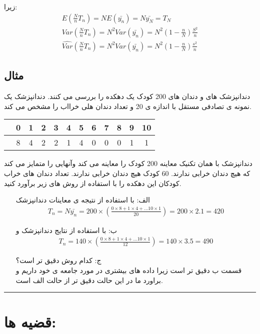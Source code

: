 زیرا:
\begin{gather*}
	E(\frac{N}{n}T_n)=NE(\bar{y_n})=N\bar{y_N}=T_N \\
	Var(\frac{N}{n}T_n)=N^2Var(\bar{y_n})=N^2(1-\frac{n}{N})\frac{S^2}{n} \\
	\hat{Var}(\frac{N}{n}T_n)=N^2Var(\bar{y_n})=N^2(1-\frac{n}{N})\frac{s^2}{n}
\end{gather*}
\subsection*{مثال}
دندانپزشک های 
و 
دندان های 200 کودک یک دهکده را بررسی می کنند.
دندانپزشک 
یک نمونه ی تصادفی مستقل با اندازه ی 20 و تعداد دندان هلی خرااب را مشخص می کند.
\vspace{1cm}
\begin{LTR}
	\begin{tabular}{|c|c|c|c|c|c|c|c|c|c|c|c|}
		\hline
		\rl{تعداد دندان های خراب} 
		& 0 & 1 & 2 & 3 & 4 & 5 & 6 & 7 & 8 & 9 & 10 \\
		\hline
		\rl{تعداد بچه ها}
		&
		8 & 4 & 2 & 2 & 1 & 4 & 0 & 0 & 0 & 1 & 1 \\
		\hline
	\end{tabular}
\end{LTR}
\vspace{1cm}
دندانپزشک 
با همان تکنیک معاینه 200 کودک را معاینه می کند وآنهایی را متمایز می کند که هیچ دندان خرابی ندارند.
60 کودک هیچ دندان خرابی ندارند.
تعداد دندان های خراب کودکان این دهکده را با استفاده از روش های زیر برآورد کنید.
\begin{itemize}
	\item[الف:] با استفاده از نتیجه ی معاینات دندانپزشک 
	\begin{gather*}
		T_n=N\bar{y_n}=200\times (\frac{0\times 8 + 1\times 4 + \dots 10\times 1}{20})
		=200\times 2.1=420
	\end{gather*}
	\item[ب:] با استفاده از نتایج دندانپزشک 
	و
	\begin{gather*}
		T_n=140\times (\frac{0\times 8 + 1\times 4 + \dots 10\times 1}{12})=140\times 3.5=490
	\end{gather*}
	\item[ج:] کدام روش دقیق تر است؟
	\\
	قسمت ب دقیق تر است زیرا داده های بیشتری در مورد جامعه ی خود داریم و براورد ما در این حالت دقیق تر از حالت الف است.
\end{itemize}
\rule{\textwidth}{0.4pt}
\section*{قضیه ها:}
